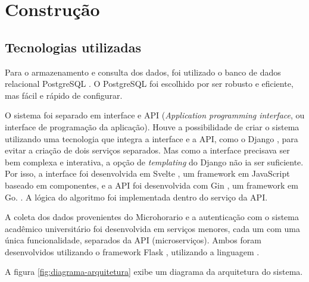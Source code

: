 \chapter{Construção}
\label{cha:Construção}

\section{Tecnologias utilizadas}

Para o armazenamento e consulta dos dados, foi utilizado o banco de dados relacional PostgreSQL \cite{site-postgresql}. O PostgreSQL foi escolhido por ser robusto e eficiente, mas fácil e rápido de configurar. 

O sistema foi separado em interface e API (\textit{Application programming interface}, ou interface de programação da aplicação). Houve a possibilidade de criar o sistema utilizando uma tecnologia que integra a interface e a API, como o Django \cite{site-django}, para evitar a criação de dois serviços separados. Mas como a interface precisava ser bem complexa e interativa, a opção de \textit{templating} do Django não ia ser suficiente. Por isso, a interface foi desenvolvida em Svelte \cite{site-svelte}, um framework em JavaScript \cite{site-js} baseado em componentes, e a API foi desenvolvida com Gin \cite{site-gin}, um framework em Go. \cite{site-go}. A lógica do algoritmo foi implementada dentro do serviço da API.

A coleta dos dados provenientes do Microhorario e a autenticação com o sistema acadêmico universitário foi desenvolvida em serviços menores, cada um com uma única funcionalidade, separados da API (microserviços). Ambos foram desenvolvidos utilizando o framework Flask \cite{site-flask}, utilizando a linguagem \cite{site-python}.

A figura \ref{fig:diagrama-arquitetura} exibe um diagrama da arquitetura do sistema.

